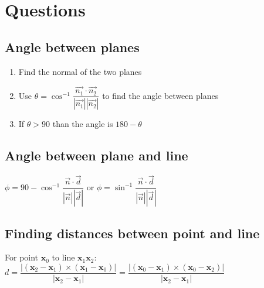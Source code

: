 \section{Questions}
\subsection{Angle between planes}
\begin{enumerate}
	\item Find the normal of the two planes
	\item Use $\theta = \cos^{-1}\dfrac{\vec{n_1}\cdot\vec{n_2}}{|\vec{n_1}||\vec{n_2}|}$ to find the angle between planes
	\item If $\theta>90$ than the angle is $180-\theta$
\end{enumerate}
\subsection{Angle between plane and line}
$\phi = 90-\cos^{-1}\dfrac{\vec{n}\cdot\vec{d}}{|\vec{n}||\vec{d}|}$ or $\phi =\sin^{-1}\dfrac{\vec{n}\cdot\vec{d}}{|\vec{n}||\vec{d}|}$
\subsection{Finding distances between point and line}
For point $\textbf{x}_0$ to line $\textbf{x}_1\textbf{x}_2$: $d=\dfrac{|(\textbf{x}_2-\textbf{x}_1)\times(\textbf{x}_1-\textbf{x}_0)|}{|\textbf{x}_2-\textbf{x}_1|}=\dfrac{|(\textbf{x}_0-\textbf{x}_1)\times(\textbf{x}_0-\textbf{x}_2)|}{|\textbf{x}_2-\textbf{x}_1|}$





